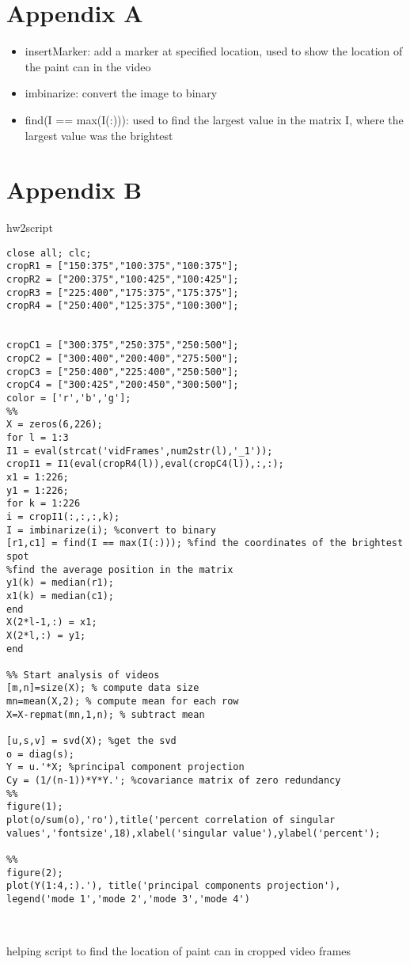 \documentclass[]{article}
\begin{document}
\section{Appendix A}
\begin{itemize}
	\item insertMarker: add a marker at specified location, used to show the location of the paint can in the video
	\item imbinarize: convert the image to binary
	\item find(I == max(I(:))): used to find the largest value in the matrix I, where the largest value was the brightest
\end{itemize}	
\section{Appendix B}
hw2script
\begin{verbatim}
close all; clc;
cropR1 = ["150:375","100:375","100:375"];
cropR2 = ["200:375","100:425","100:425"];
cropR3 = ["225:400","175:375","175:375"];
cropR4 = ["250:400","125:375","100:300"];


cropC1 = ["300:375","250:375","250:500"];
cropC2 = ["300:400","200:400","275:500"];
cropC3 = ["250:400","225:400","250:500"];
cropC4 = ["300:425","200:450","300:500"];
color = ['r','b','g'];
%%
X = zeros(6,226);
for l = 1:3
I1 = eval(strcat('vidFrames',num2str(l),'_1'));
cropI1 = I1(eval(cropR4(l)),eval(cropC4(l)),:,:);
x1 = 1:226;
y1 = 1:226;
for k = 1:226
i = cropI1(:,:,:,k);
I = imbinarize(i); %convert to binary 
[r1,c1] = find(I == max(I(:))); %find the coordinates of the brightest spot
%find the average position in the matrix
y1(k) = median(r1);
x1(k) = median(c1);
end
X(2*l-1,:) = x1;
X(2*l,:) = y1;
end

%% Start analysis of videos
[m,n]=size(X); % compute data size
mn=mean(X,2); % compute mean for each row
X=X-repmat(mn,1,n); % subtract mean

[u,s,v] = svd(X); %get the svd
o = diag(s);
Y = u.'*X; %principal component projection
Cy = (1/(n-1))*Y*Y.'; %covariance matrix of zero redundancy
%%
figure(1);
plot(o/sum(o),'ro'),title('percent correlation of singular values','fontsize',18),xlabel('singular value'),ylabel('percent');

%%
figure(2);
plot(Y(1:4,:).'), title('principal components projection'), legend('mode 1','mode 2','mode 3','mode 4')



\end{verbatim}
helping script to find the location of paint can in cropped video frames
\end{document}
